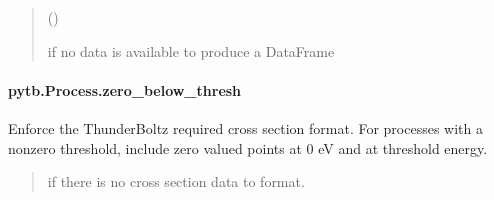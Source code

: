 \documentclass[letterpaper,10pt,english,openany,oneside]{sphinxmanual}
\begin{document}
\begin{fulllineitems}
\begin{fulllineitems}
\begin{quote}
\begin{description}
\sphinxAtStartPar
()

\sphinxAtStartPar
{} \textendash{} if no data is available to produce a DataFrame

\end{description}\end{quote}

\end{fulllineitems}


\sphinxstepscope


\paragraph{pytb.Process.zero\_below\_thresh}
\label{\detokenize{api/pytb.Process.zero_below_thresh:pytb-process-zero-below-thresh}}\label{\detokenize{api/pytb.Process.zero_below_thresh::doc}}

\begin{fulllineitems}
\label{\detokenize{api/pytb.Process.zero_below_thresh:pytb.Process.zero_below_thresh}}
\pysigstartsignatures
{}
\pysigstopsignatures
\sphinxAtStartPar
Enforce the ThunderBoltz required cross section format.
For processes with a non\sphinxhyphen{}zero threshold, include zero valued
points at 0 eV and at threshold energy.
\begin{quote}\begin{description}
\sphinxAtStartPar
{} \textendash{} if there is no cross section data to format.

\end{description}\end{quote}

\end{fulllineitems}


\end{fulllineitems}


\sphinxstepscope
\end{document}
